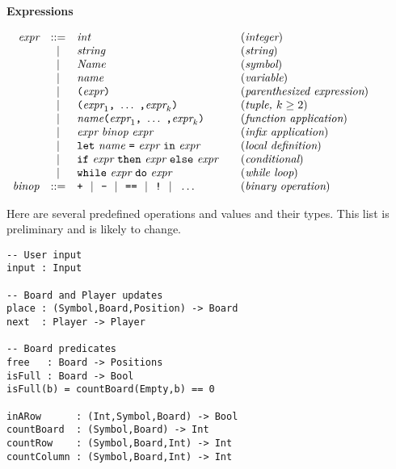 \documentclass[11pt]{article}
\makeatletter
\newcommand{\prodName}[1]{&(\emph{#1})\\}
\newcommand{\nt}[1]{\textit{#1}}
\newcommand{\prog}[1]{\texttt{#1}}
\newcommand{\ORil}{\ \ |\ \ }
\newcommand{\IS}{&::=&}
\newcommand{\OR}{&|&}
\newcommand{\syntax}[2]{
  \needspace{3\baselineskip}
  \bigskip\par\noindent\textbf{#1}\par\smallskip%
  $\begin{array}{rcl@{\qquad}l}#2\end{array}$%
  \par\bigskip\noindent\ignorespaces
}
\newcommand{\lp}{\prog{(}}
\newcommand{\rp}{\prog{)}}
\newcommand{\paren}[1]{\lp#1\rp}
\makeatother
\begin{document}
\syntax{Expressions}{
\nt{expr}     \IS  \nt{int}                                 \prodName{integer}
              \OR  \nt{string}                               \prodName{string}
              \OR  \nt{Name}                                 \prodName{symbol}
              \OR  \nt{name}                               \prodName{variable}
              \OR  \paren{\nt{expr}}       \prodName{parenthesized expression}
              \OR  \paren{\nt{expr}_1\prog{,}\ \ldots\ \prog{,}\nt{expr}_k}
                                                    \prodName{tuple, $k\geq 2$}
              \OR  \nt{name}\paren{\nt{expr}_1\prog{,}\ \ldots\
                                              \prog{,}\nt{expr}_k}
                                               \prodName{function application}
              \OR  \nt{expr}\ \nt{binop}\ \nt{expr}
                                                  \prodName{infix application}
             \OR  \prog{let}\ \nt{name}\ \prog{=}\ \nt{expr}\
                   \prog{in}\ \nt{expr}            \prodName{local definition}
              \OR  \prog{if}\ \nt{expr}\ \prog{then}\ \nt{expr}\
                   \prog{else}\ \nt{expr}               \prodName{conditional}
              \OR  \prog{while}\ \nt{expr}\ \prog{do}\ \nt{expr}
                                                         \prodName{while loop}
%
\nt{binop}    \IS  \prog{+} \ORil \prog{-} \ORil
                   \prog{==} \ORil \prog{!} \ORil \ldots
                                                   \prodName{binary operation}
}
%
%
%
Here are several predefined operations and values and their types. This list is preliminary and is likely to change.

\begin{verbatim}
-- User input
input : Input

-- Board and Player updates
place : (Symbol,Board,Position) -> Board
next  : Player -> Player

-- Board predicates
free   : Board -> Positions
isFull : Board -> Bool
isFull(b) = countBoard(Empty,b) == 0

inARow      : (Int,Symbol,Board) -> Bool
countBoard  : (Symbol,Board) -> Int
countRow    : (Symbol,Board,Int) -> Int
countColumn : (Symbol,Board,Int) -> Int
\end{verbatim}


\end{document}
